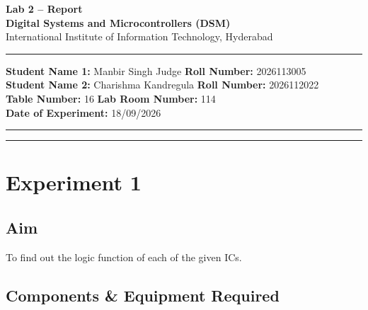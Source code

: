 \documentclass[11pt, a4paper]{article}
\begin{document}
\thispagestyle{no_hdr_border_rule}

\begin{center}
    {\Large \textbf{Lab 2 -- Report}} \\[0.2cm]
    {\large \textbf{Digital Systems and Microcontrollers (DSM)}} \\[0.1cm]
    {\normalsize International Institute of Information Technology, Hyderabad} \\[0.3cm]
\end{center}

\vspace{0.2cm}
\hrule
\vspace{0.4cm}

\noindent \textbf{Student Name 1:} Manbir Singh Judge \hfill \textbf{Roll Number:} 2026113005 \\
\noindent \textbf{Student Name 2:} Charishma Kandregula \hfill \textbf{Roll Number:} 2026112022 \\
\noindent \textbf{Table Number:} 16 \hfill \textbf{Lab Room Number:} 114 \\
\noindent \textbf{Date of Experiment:} 18/09/2026

\vspace{0.4cm}
\hrule
\vspace{0.5cm}

\vspace{1em}

\tableofcontents
\vspace{0.5cm}
\hrule
\vspace{0.8cm}

\newpage
{}


\section{Experiment 1}

\subsection{Aim}

To find out the logic function of each of the given ICs.

\subsection{Components \& Equipment Required}
\end{document}
